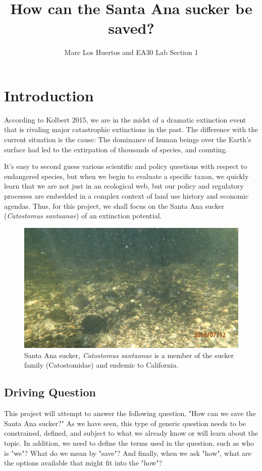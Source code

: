 \documentclass{tufte-handout}\usepackage[]{graphicx}\usepackage[]{color}
\title{How can the Santa Ana sucker be saved?}
\author{Marc Los Huertos and EA30 Lab Section 1}
\begin{document}
\maketitle

\section{Introduction}

According to Kolbert 2015, we are in the midst of a dramatic extinction event that is rivaling major catastrophic extinctions in the past. The difference with the current situation is the cause: The dominance of human beings over the Earth's surface had led to the extirpation of thousands of species, and counting. 

It's easy to second guess various scientific and policy questions with respect to endangered species, but when we begin to evaluate a specific taxon, we quickly learn that we are not just in an ecological web, but our policy and regulatory processes are embedded in a complex context of land use history and economic agendas. Thus, for this project, we shall focus on the Santa Ana sucker (\emph{Catostomus santaanae}) of an extinction potential.  

\begin{figure}
    \includegraphics[width=1.0\textwidth]{sucker_images/P7120719.JPG}
  \caption{Santa Ana sucker, \emph{Catostomus santaanae} is a member of the sucker family (Catostomidae) and endemic to California.}
\end{figure}

\subsection{Driving Question}

This project will attempt to answer the following question, "How can we save the Santa Ana sucker?" As we have seen, this type of generic question needs to be constrained, defined, and subject to what we already know or will learn about the topic. In addition, we need to define the terms used in the question, such as who is "we"? What do we mean by "save"?  And finally, when we ask "how", what are the options available that might fit into the "how"? 
\end{document}
